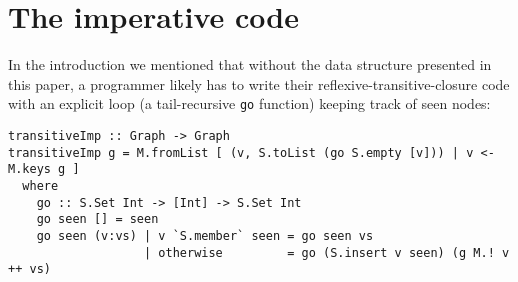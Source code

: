 \documentclass[manuscript,screen,acmsmall]{acmart}
\begin{document}
\clearpage
\appendix
\section{The imperative code}\label{sec:imp}

In the introduction we mentioned that without the data structure presented in this paper, a programmer likely has to write their reflexive-transitive-closure code with an explicit loop (a tail-recursive \verb|go| function) keeping track of seen nodes:
\begin{verbatim}
transitiveImp :: Graph -> Graph
transitiveImp g = M.fromList [ (v, S.toList (go S.empty [v])) | v <- M.keys g ]
  where
    go :: S.Set Int -> [Int] -> S.Set Int
    go seen [] = seen
    go seen (v:vs) | v `S.member` seen = go seen vs
                   | otherwise         = go (S.insert v seen) (g M.! v ++ vs)
\end{verbatim}
\end{document}
